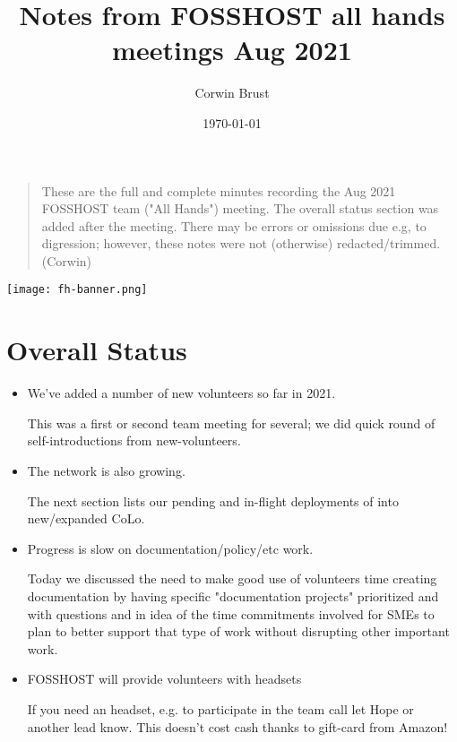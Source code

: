 \documentclass[11pt]{article}
\author{Corwin Brust}
\date{\today}
\title{Notes from FOSSHOST all hands meetings Aug 2021}
\begin{document}
\maketitle
\tableofcontents

\begin{quote}
These are the full and complete minutes recording the Aug 2021
FOSSHOST team ("All Hands") meeting. The overall status section was
added after the meeting.  There may be errors or omissions due e.g, to
digression; however, these notes were not (otherwise)
redacted/trimmed.  (Corwin)
\end{quote}
\begin{center}
\texttt{[image: fh-banner.png]}
\end{center}
\section{Overall Status}
\label{sec:org3a9b655}

\begin{itemize}
\item We've added a number of new volunteers so far in 2021.

This was a first or second team meeting for several; we
did quick round of self-introductions from new-volunteers.

\item The network is also growing.

The next section lists our pending and in-flight deployments of
into new/expanded CoLo.

\item Progress is slow on documentation/policy/etc work.

Today we discussed the need to make good use of volunteers time
creating documentation by having specific "documentation projects"
prioritized and with questions and in idea of the time commitments
involved for SMEs to plan to better support that type of work
without disrupting other important work.

\item FOSSHOST will provide volunteers with headsets

If you need an headset, e.g. to participate in the team call let
Hope or another lead know. This doesn't cost cash thanks to
gift-card from Amazon!
\end{itemize}
\end{document}
